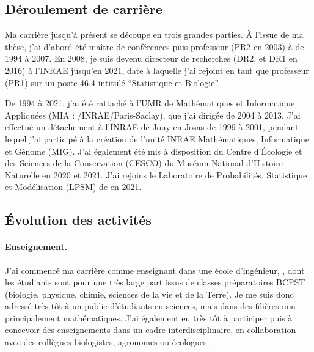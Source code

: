 \subsection*{Déroulement de carrière}

Ma carrière jusqu'à présent se découpe en trois grandes parties. À l'issue de ma thèse, j'ai d'abord été maître de conférences puis professeur (PR2 en 2003) à \APT de 1994 à 2007. En 2008, je suis devenu directeur de recherches (DR2, et DR1 en 2016) à l'INRAE jusqu'en 2021, date à laquelle j'ai rejoint \SU en tant que professeur (PR1) sur un poste 46.4 intitulé ``Statistique et Biologie''. 

De 1994 à 2021, j'ai été rattaché à l'UMR de Mathématiques et Informatique Appliquées (MIA : \APT/INRAE/Paris-Saclay), que j'ai dirigée de 2004 à 2013. 
J'ai effectué un détachement à l'INRAE de Jouy-en-Josas de 1999 à 2001, pendant lequel j'ai participé à la création de l'unité INRAE Mathématiques, Informatique et Génome (MIG). 
J'ai également été mis à disposition du Centre d'Écologie et des Sciences de la Conservation (CESCO) du Muséum National d'Histoire Naturelle en 2020 et 2021. J'ai rejoins le Laboratoire de Probabilités, Statistique et Modélisation (LPSM) de \SU en 2021.


\subsection*{\'Evolution des activités}

\paragraph{Enseignement.}
J'ai commencé ma carrière comme enseignant dans une école d'ingénieur, \APT, dont les étudiants sont pour une très large part issus de classes préparatoires BCPST (biologie, physique, chimie, sciences de la vie et de la Terre). Je me suis donc adressé très tôt à un public d’étudiants en sciences, mais dans des filières non principalement mathématiques. J’ai également eu très tôt à participer puis à concevoir des enseignements dans un cadre interdisciplinaire, en collaboration avec des collègues biologistes, agronomes ou écologues. 

